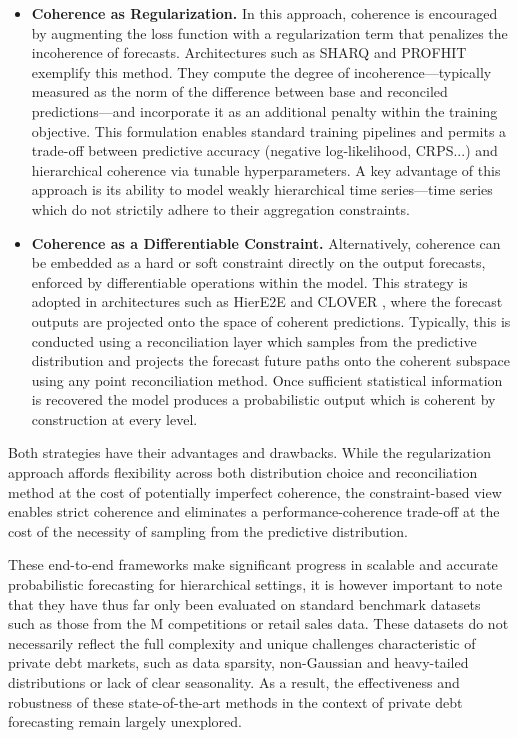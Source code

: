 \documentclass[letterpaper]{article}
\begin{document}
\begin{itemize}
    \item \textbf{Coherence as Regularization.}
In this approach, coherence is encouraged by augmenting the loss function with a regularization term that penalizes the incoherence of forecasts. Architectures such as SHARQ \cite{SHARQ} and PROFHIT \cite{PROFHIT} exemplify this method. They compute the degree of incoherence—typically measured as the norm of the difference between base and reconciled predictions—and incorporate it as an additional penalty within the training objective. This formulation enables standard training pipelines and permits a trade-off between predictive accuracy (negative log-likelihood, CRPS...) and hierarchical coherence via tunable hyperparameters. A key advantage of this approach is its ability to model weakly hierarchical time series---time series which do not strictily adhere to their aggregation constraints. 

\item \textbf{Coherence as a Differentiable Constraint.}
Alternatively, coherence can be embedded as a hard or soft constraint directly on the output forecasts, enforced by differentiable operations within the model. This strategy is adopted in architectures such as HierE2E \cite{HierE2E} and CLOVER \cite{CLOVER}, where the forecast outputs are projected onto the space of coherent predictions. Typically, this is conducted using a reconciliation layer which samples from the predictive distribution and projects the forecast future paths onto the coherent subspace using any point reconciliation method. Once sufficient statistical information is recovered the model produces a probabilistic output which is coherent by construction at every level.
\end{itemize}

Both strategies have their advantages and drawbacks. While the regularization approach affords flexibility across both distribution choice and reconciliation method at the cost of potentially imperfect coherence, the constraint-based view enables strict coherence and eliminates a performance-coherence trade-off at the cost of the necessity of sampling from the predictive distribution.

These end-to-end frameworks make significant progress in scalable and accurate probabilistic forecasting for hierarchical settings, it is however important to note that they have thus far only been evaluated on standard benchmark datasets such as those from the M competitions or retail sales data. These datasets do not necessarily reflect the full complexity and unique challenges characteristic of private debt markets, such as data sparsity, non-Gaussian and heavy-tailed distributions or lack of clear seasonality. As a result, the effectiveness and robustness of these state-of-the-art methods in the context of private debt forecasting remain largely unexplored.
\end{document}
